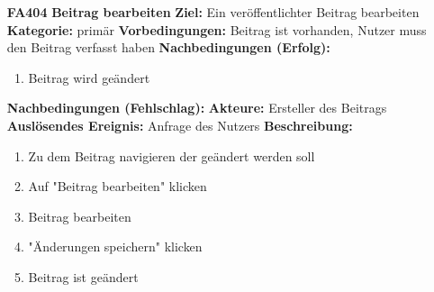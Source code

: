\documentclass[parskip=full]{scrartcl}
\begin{document}
\begin{itemize}[nosep]
			\item[\textbf{FA404}]\textbf{Beitrag bearbeiten}
			\newline \textbf{Ziel:} Ein veröffentlichter Beitrag bearbeiten
			\newline \textbf{Kategorie:} primär
			\newline \textbf{Vorbedingungen:} Beitrag ist vorhanden, Nutzer muss den Beitrag verfasst haben
			\newline \textbf{Nachbedingungen (Erfolg):}
			\begin{enumerate}[nosep]
				\item Beitrag wird geändert
			\end{enumerate}
			\textbf{Nachbedingungen (Fehlschlag):}
			\newline \textbf{Akteure:} Ersteller des Beitrags
			\newline \textbf{Auslösendes Ereignis:} Anfrage des Nutzers
			\newline \textbf{Beschreibung:}
			\begin{enumerate}[nosep]
				\item Zu dem Beitrag navigieren der geändert werden soll
				\item Auf "Beitrag bearbeiten" klicken
				\item Beitrag bearbeiten
				\item "Änderungen speichern" klicken
				\item Beitrag ist geändert\\
			\end{enumerate}
			

\end{itemize}
\end{document}
